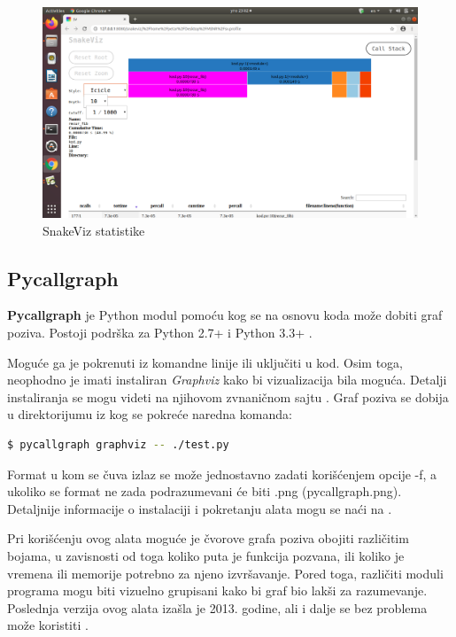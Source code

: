 \documentclass[a4paper]{article}
\begin{document}
\begin{figure}[h!]
\begin{center}
\includegraphics[trim={3cm 7.5cm 35cm 14cm},clip,scale=0.55]{snakeviz2.png}
\end{center}
\caption{SnakeViz statistike}
\label{fig:snake_viz_2}
\end{figure}
    
\subsection{Pycallgraph}
\label{profajler_4}
\textbf{Pycallgraph} je Python modul pomoću kog se na osnovu koda može dobiti graf poziva. Postoji podrška za Python 2.7+ i Python 3.3+ \cite{Pycallgraph}.

Moguće ga je pokrenuti iz komandne linije ili uključiti u kod. Osim toga, neophodno je imati instaliran {\em Graphviz} kako bi vizualizacija bila moguća. Detalji instaliranja se mogu videti na njihovom zvnaničnom sajtu \cite{Graphviz}. Graf poziva se dobija u direktorijumu iz kog se pokreće naredna komanda:
\begin{lstlisting}[language=bash,frame=single, label=lst:pycallgraph, belowskip=-\baselineskip]
  $ pycallgraph graphviz -- ./test.py 
\end{lstlisting}
Format u kom se čuva izlaz se može jednostavno zadati korišćenjem opcije -f, a ukoliko se format ne zada podrazumevani će biti .png (pycallgraph.png).  Detaljnije informacije o instalaciji i pokretanju alata mogu se naći na \cite{Pycallgraph}.

Pri korišćenju ovog alata moguće je čvorove grafa poziva obojiti različitim bojama, u zavisnosti od toga koliko puta je funkcija pozvana, ili koliko je vremena ili memorije potrebno za njeno izvršavanje. Pored toga, različiti moduli programa mogu biti vizuelno grupisani kako bi graf bio lakši za razumevanje. Poslednja verzija ovog alata izašla je 2013. godine, ali i dalje se bez problema može koristiti \cite{Pycallgraph}.
\end{document}
